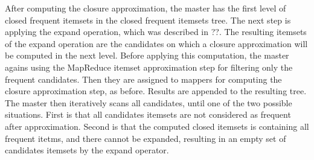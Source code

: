 After computing the closure approximation, the master has
the first level of closed frequent itemsets in the closed
frequent itemsets tree. The next step is applying the
expand operation, which was described in ??. The resulting
itemsets of the expand operation are the candidates on which
a closure approximation will be computed in the next level.
Before applying this computation, the master agains using
the MapReduce itemset approximation step for filtering only
the frequent candidates. Then they are assigned to mappers
for computing the closure approximation step, as before.
Results are appended to the resulting tree. The master then
iteratively scans all candidates, until one of the two
possible situations. First is that all candidates itemsets
are not considered as frequent after approximation. Second
is that the computed closed itemsets is containing all
frequent itetms, and there cannot be expanded, resulting in
an empty set of candidates itemsets by the expand operator.
